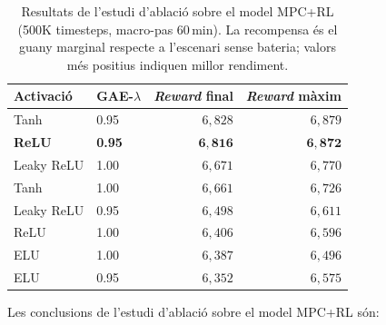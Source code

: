 \documentclass[a4paper,12pt,twoside]{ThesisStyle}
\begin{document}
\begin{table}[htb]
\centering
\small
\begin{tabular}{@{}llrr@{}}
\toprule
\textbf{Activació} & \textbf{GAE-$\lambda$} & \textbf{\textit{Reward} final} & \textbf{\textit{Reward} màxim} \\
\midrule
Tanh               & 0.95 & $6{,}828$ & $6{,}879$ \\
\textbf{ReLU}      & \textbf{0.95} & $\mathbf{6{,}816}$ & $\mathbf{6{,}872}$ \\
Leaky ReLU         & 1.00 & $6{,}671$ & $6{,}770$ \\
Tanh               & 1.00 & $6{,}661$ & $6{,}726$ \\
\midrule
Leaky ReLU         & 0.95 & $6{,}498$ & $6{,}611$ \\
ReLU               & 1.00 & $6{,}406$ & $6{,}596$ \\
ELU                & 1.00 & $6{,}387$ & $6{,}496$ \\
ELU                & 0.95 & $6{,}352$ & $6{,}575$ \\
\bottomrule
\end{tabular}
\caption{Resultats de l'estudi d'ablació sobre el model MPC+RL (500K timesteps, macro-pas 60\,min). La recompensa és el guany marginal respecte a l'escenari sense bateria; valors més positius indiquen millor rendiment.}
\label{taula:ablacio}
\end{table}

Les conclusions de l'estudi d'ablació sobre el model MPC+RL són:
\end{document}
